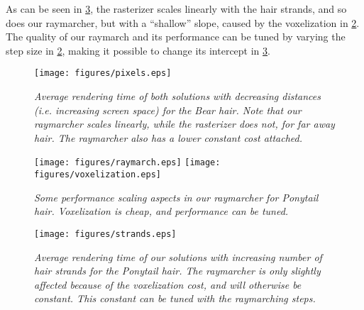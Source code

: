 \documentclass{egpubl}
\begin{document}

As can be seen in \cref{fig:strands}, the rasterizer scales linearly with the hair strands, and so does our raymarcher, but with a ``shallow'' slope, caused by the voxelization in \cref{fig:raymarch}. The quality of our raymarch and its performance can be tuned by varying the step size in \cref{fig:raymarch}, making it possible to change its intercept in \cref{fig:strands}.

\newpage

\begin{figure}[H]
    \centering
    \texttt{[image: figures/pixels.eps]}
    \caption{\emph{Average rendering time of both solutions with decreasing distances (i.e. increasing screen space) for the Bear hair. Note that our raymarcher scales linearly, while the rasterizer does not, for far away hair. The raymarcher also has a lower constant cost attached.}}
    \label{fig:pixels}
    \vspace{-2mm}
\end{figure}

\begin{figure}[H]
    \centering
    \texttt{[image: figures/raymarch.eps]}
    \hfill
    \texttt{[image: figures/voxelization.eps]}
    \caption{\emph{Some performance scaling aspects in our raymarcher for Ponytail hair. Voxelization is cheap, and performance can be tuned.}}
    \label{fig:raymarch}
    \vspace{-2mm}
\end{figure}

\begin{figure}[H]
    \centering
    \texttt{[image: figures/strands.eps]}
    \caption{\emph{Average rendering time of our solutions with increasing number of hair strands for the Ponytail hair. The raymarcher is only slightly affected because of the voxelization cost, and will otherwise be constant. This constant can be tuned with the raymarching steps.}}
    \label{fig:strands}
    \vspace{-2mm}
\end{figure}
\end{document}
